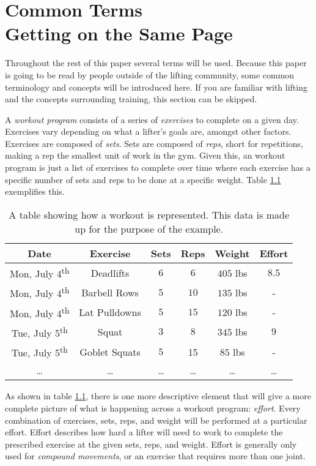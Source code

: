 \chapter{
    Common Terms
    \\
    \large{Getting on the Same Page}
}
\label{sec:CommonTermsSection}

Throughout the rest of this paper several terms will be used. Because this paper is going to be read by people outside of the lifting community, some common terminology and concepts will be introduced here. If you are familiar with lifting and the concepts surrounding training, this section can be skipped.

A \textit{workout program} consists of a series of \textit{exercises} to complete on a given day. Exercises vary depending on what a lifter's goals are, amongst other factors. Exercises are composed of \textit{sets}. Sets are composed of \textit{reps}, short for repetitions, making a rep the smallest unit of work in the gym. Given this, an workout program is just a list of exercises to complete over time where each exercise has a specific number of sets and reps to be done at a specific weight. Table \ref{tab:WorkoutProgramExample} exemplifies this.

\begin{table}[h]
    \centering
    \begin{tabular}{c|c|c|c|c|c}
        Date & Exercise & Sets & Reps & Weight & Effort \\
        \hline
        Mon, July 4\textsuperscript{th} & Deadlifts & $6$ & $6$ & $405$ lbs & $8.5$ \\
        Mon, July 4\textsuperscript{th} & Barbell Rows & $5$ & $10$ & $135$ lbs & - \\
        Mon, July 4\textsuperscript{th} & Lat Pulldowns & $5$ & $15$ & $120$ lbs & - \\
        Tue, July 5\textsuperscript{th} & Squat & $3$ & $8$ & $345$ lbs & $9$ \\
        Tue, July 5\textsuperscript{th} & Goblet Squats & $5$ & 15 & $85$ lbs & - \\
        \dots & \dots & \dots & \dots & \dots & \dots \\
    \end{tabular}
    \caption{A table showing how a workout is represented. This data is made up for the purpose of the example.}
    \label{tab:WorkoutProgramExample}
\end{table}

As shown in table \ref{tab:WorkoutProgramExample}, there is one more descriptive element that will give a more complete picture of what is happening across a workout program: \textit{effort}. Every combination of exercises, sets, reps, and weight will be performed at a particular effort. Effort describes how hard a lifter will need to work to complete the prescribed exercise at the given sets, reps, and weight. Effort is generally only used for \textit{compound movements}, or an exercise that requires more than one joint.


